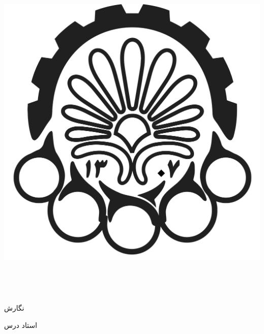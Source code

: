 
\begin{center}

\includegraphics[scale=0.04]{front/template/images/logo.png}

\vspace{-0.2cm}
\ThesisUniversity \\[-0.3em]
\ThesisDepartment

\begin{large}
\vspace{0.5cm}

\ThesisType \ \\[-0.3em]

\end{large}

\vspace{3cm}

{\LARGE\textbf{\ThesisTitle}}

\vspace{2cm}

{نگارش}\\[.5em]
{\large\textbf{\ThesisAuthor}}

\vspace{0.7cm}

{استاد درس}\\[.5em]
{\large\textbf{\ThesisSupervisor}}

\vspace{1.3cm}

\ThesisDate

\end{center}

\newpage
